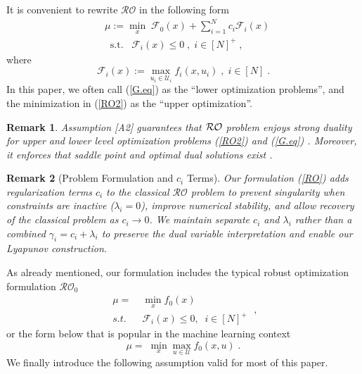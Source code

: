 \documentclass[journal,twoside,web]{ieeecolor}
\newcommand{\rev}[1]{\textcolor{revisionblue}{#1}}
\newtheorem{remark}{Remark}
\begin{document}
It is convenient to rewrite $\mathcal{RO}$ in the following form
\begin{align}
&\mu:=\underset{x}{\min} \; \mathcal{F}_0(x)+\sum_{i=1}^N c_i\mathcal{F}_i(x)\label{RO2}\\
&\;\;\text{s.t.}\;\;\;\mathcal{F}_i(x)\leq 0\;,\;i\in[N]^+\;,\nonumber
\end{align}
where
\begin{equation}\label{G.eq}
\mathcal{F}_i(x):=\max_{u_i\in \mathcal{U}_i} f_i(x,u_i)\;,\; i\in[N]\;.
\end{equation}
In this paper, we often call (\ref{G.eq}) as the ``lower optimization problems'', and the minimization in (\ref{RO2}) as the ``upper optimization''.

\begin{remark} \label{strong_duality_rem}
\rev{Assumption [A2] guarantees that ${\cal RO}$ problem enjoys strong duality for upper and lower level optimization problems (\ref{RO2}) and (\ref{G.eq}) \cite[Section~5.2.3, 5.9.1]{boyd2004}. Moreover, it enforces that saddle point and optimal dual solutions exist \cite{bental2009-2}.}
\end{remark}

\begin{remark}[\rev{Problem Formulation and $c_i$ Terms}]
\rev{Our formulation (\ref{RO}) adds regularization terms $c_i$ to the classical $\mathcal{RO}$ problem to prevent singularity when constraints are inactive ($\lambda_i = 0$), improve numerical stability, and allow recovery of the classical problem as $c_i \to 0$. We maintain separate $c_i$ and $\lambda_i$ rather than a combined $\gamma_i = c_i + \lambda_i$ to preserve the dual variable interpretation and enable our Lyapunov construction.}
\end{remark}

As already mentioned, our formulation includes the typical robust optimization formulation $\mathcal{RO}_0$
\begin{equation}
\begin{array}{lcc}
\mu=&\;\displaystyle\min_x f_0(x)\\
s.t.&\; \mathcal{F}_i(x)\leq 0,\;\;i\in[N]^+
\end{array}\;,
\label{RO3}
\end{equation}
or the form below that is popular in the machine learning context \cite{rafique2022,zhang2021}
\begin{equation}
\mu=\;\displaystyle\min_x\max_{u\in \mathcal{U}} f_0(x,u)\;.
\end{equation}
We finally introduce the following assumption valid for most of this paper.
\end{document}
